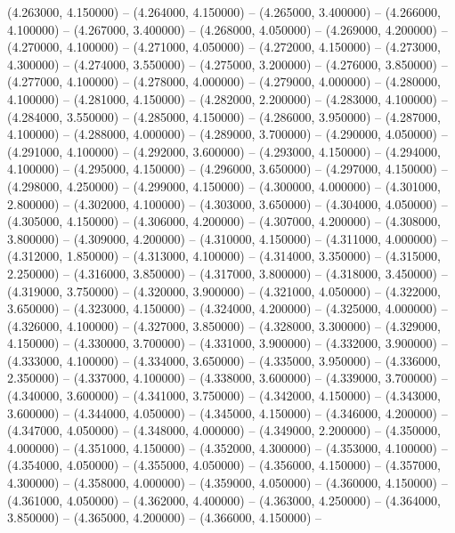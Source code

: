 (4.263000, 4.150000) -- 
(4.264000, 4.150000) -- 
(4.265000, 3.400000) -- 
(4.266000, 4.100000) -- 
(4.267000, 3.400000) -- 
(4.268000, 4.050000) -- 
(4.269000, 4.200000) -- 
(4.270000, 4.100000) -- 
(4.271000, 4.050000) -- 
(4.272000, 4.150000) -- 
(4.273000, 4.300000) -- 
(4.274000, 3.550000) -- 
(4.275000, 3.200000) -- 
(4.276000, 3.850000) -- 
(4.277000, 4.100000) -- 
(4.278000, 4.000000) -- 
(4.279000, 4.000000) -- 
(4.280000, 4.100000) -- 
(4.281000, 4.150000) -- 
(4.282000, 2.200000) -- 
(4.283000, 4.100000) -- 
(4.284000, 3.550000) -- 
(4.285000, 4.150000) -- 
(4.286000, 3.950000) -- 
(4.287000, 4.100000) -- 
(4.288000, 4.000000) -- 
(4.289000, 3.700000) -- 
(4.290000, 4.050000) -- 
(4.291000, 4.100000) -- 
(4.292000, 3.600000) -- 
(4.293000, 4.150000) -- 
(4.294000, 4.100000) -- 
(4.295000, 4.150000) -- 
(4.296000, 3.650000) -- 
(4.297000, 4.150000) -- 
(4.298000, 4.250000) -- 
(4.299000, 4.150000) -- 
(4.300000, 4.000000) -- 
(4.301000, 2.800000) -- 
(4.302000, 4.100000) -- 
(4.303000, 3.650000) -- 
(4.304000, 4.050000) -- 
(4.305000, 4.150000) -- 
(4.306000, 4.200000) -- 
(4.307000, 4.200000) -- 
(4.308000, 3.800000) -- 
(4.309000, 4.200000) -- 
(4.310000, 4.150000) -- 
(4.311000, 4.000000) -- 
(4.312000, 1.850000) -- 
(4.313000, 4.100000) -- 
(4.314000, 3.350000) -- 
(4.315000, 2.250000) -- 
(4.316000, 3.850000) -- 
(4.317000, 3.800000) -- 
(4.318000, 3.450000) -- 
(4.319000, 3.750000) -- 
(4.320000, 3.900000) -- 
(4.321000, 4.050000) -- 
(4.322000, 3.650000) -- 
(4.323000, 4.150000) -- 
(4.324000, 4.200000) -- 
(4.325000, 4.000000) -- 
(4.326000, 4.100000) -- 
(4.327000, 3.850000) -- 
(4.328000, 3.300000) -- 
(4.329000, 4.150000) -- 
(4.330000, 3.700000) -- 
(4.331000, 3.900000) -- 
(4.332000, 3.900000) -- 
(4.333000, 4.100000) -- 
(4.334000, 3.650000) -- 
(4.335000, 3.950000) -- 
(4.336000, 2.350000) -- 
(4.337000, 4.100000) -- 
(4.338000, 3.600000) -- 
(4.339000, 3.700000) -- 
(4.340000, 3.600000) -- 
(4.341000, 3.750000) -- 
(4.342000, 4.150000) -- 
(4.343000, 3.600000) -- 
(4.344000, 4.050000) -- 
(4.345000, 4.150000) -- 
(4.346000, 4.200000) -- 
(4.347000, 4.050000) -- 
(4.348000, 4.000000) -- 
(4.349000, 2.200000) -- 
(4.350000, 4.000000) -- 
(4.351000, 4.150000) -- 
(4.352000, 4.300000) -- 
(4.353000, 4.100000) -- 
(4.354000, 4.050000) -- 
(4.355000, 4.050000) -- 
(4.356000, 4.150000) -- 
(4.357000, 4.300000) -- 
(4.358000, 4.000000) -- 
(4.359000, 4.050000) -- 
(4.360000, 4.150000) -- 
(4.361000, 4.050000) -- 
(4.362000, 4.400000) -- 
(4.363000, 4.250000) -- 
(4.364000, 3.850000) -- 
(4.365000, 4.200000) -- 
(4.366000, 4.150000) -- 
